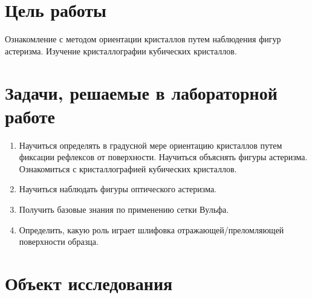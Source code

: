 
\section{Цель работы}\label{sec:purpose}


Ознакомление с методом ориентации кристаллов путем наблюдения фигур астеризма.
Изучение кристаллографии кубических кристаллов.


\section{Задачи, решаемые в лабораторной работе}\label{sec:tasks}
\begin{enumerate}
	\item{Научиться определять в градусной мере ориентацию кристаллов путем фиксации рефлексов от поверхности.
	Научиться объяснять фигуры астеризма. Ознакомиться с кристаллографией кубических кристаллов.}
	\item Научиться наблюдать фигуры оптического астеризма.
	\item Получить базовые знания по применению сетки Вульфа.
	\item Определить, какую роль играет шлифовка отражающей/преломляющей поверхности образца.
\end{enumerate}

\section{Объект исследования}\label{sec:object}

